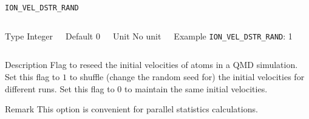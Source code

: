 \begin{frame}[allowframebreaks]{\texttt{ION\_VEL\_DSTR\_RAND}} \label{ION_VEL_DSTR_RAND}
\vspace*{-12pt}
\begin{columns}
\begin{block}{Type}
Integer
\end{block}

\begin{block}{Default}
0
\end{block}

\begin{block}{Unit}
No unit
\end{block}

\begin{block}{Example}
\texttt{ION\_VEL\_DSTR\_RAND}: 1
\end{block}
\end{columns}

\begin{block}{Description}
Flag to reseed the initial velocities of atoms in a QMD simulation. Set this flag to $1$ to shuffle (change the random seed for) the initial velocities for different runs. Set this flag to $0$ to maintain the same initial velocities.
\end{block}

\begin{block}{Remark}
This option is convenient for parallel statistics calculations.
\end{block}

\end{frame}



